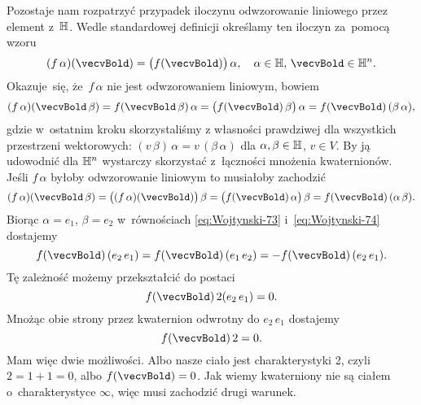\documentclass[a4paper,11pt]{article}
\numberwithin{equation}{section}
\begin{document}
Pozostaje nam rozpatrzyć przypadek iloczynu odwzorowanie liniowego przez
element z~$\mathbb{H}$. Wedle standardowej definicji określamy ten iloczyn
za~pomocą wzoru
\begin{equation}
  \label{eq:Wojtynski-72}
  ( f \, \alpha )( \vecvBold ) = \big( f( \vecvBold ) \big) \, \alpha, \quad
  \alpha \in \Hbb, \, \vecvBold \in \Hbb^{ n }.
\end{equation}
Okazuje~się, że~$f \, \alpha$ nie jest odwzorowaniem liniowym, bowiem
\begin{equation}
  \label{eq:Wojtynski-73}
  ( f \, \alpha )( \vecvBold \, \beta ) = f( \vecvBold \, \beta ) \, \alpha =
  \big( f( \vecvBold ) \, \beta \big) \, \alpha =
  f( \vecvBold ) \, ( \beta \, \alpha ),
\end{equation}
gdzie w~ostatnim kroku skorzystaliśmy z własności prawdziwej dla
wszystkich przestrzeni wektorowych:
$( v \, \beta ) \, \alpha = v \, ( \beta \, \alpha )$ dla $\alpha, \beta \in \mathbb{H}$, $v \in V$. By ją
udowodnić dla $\mathbb{H}^{ n }$ wystarczy skorzystać z~łączności mnożenia
kwaternionów. Jeśli $f \, \alpha$ byłoby odwzorowanie liniowym to musiałoby
zachodzić
\begin{equation}
  \label{eq:Wojtynski-74}
  ( f \, \alpha )( \vecvBold \, \beta ) =
  \big( ( f \, \alpha )( \vecvBold ) \big) \, \beta =
  \big( f( \vecvBold ) \, \alpha \big) \, \beta =
  f( \vecvBold ) \, ( \alpha \, \beta ).
\end{equation}
Biorąc $\alpha = e_{ 1 }$, $\beta = e_{ 2 }$ w~równościach \eqref{eq:Wojtynski-73}
i~\eqref{eq:Wojtynski-74} dostajemy
\begin{equation}
  \label{eq:Wojtynski-75}
  f( \vecvBold ) \, ( e_{ 2 } \, e_{ 1 } ) =
  f( \vecvBold ) \, ( e_{ 1 } \, e_{ 2 } ) =
  -f( \vecvBold ) \, ( e_{ 2 } \, e_{ 1 } ).
\end{equation}
Tę zależność możemy przekształcić do postaci
\begin{equation}
  \label{eq:Wojtynski-76}
  f( \vecvBold ) \, 2 ( e_{ 2 } \, e_{ 1 } ) = 0.
\end{equation}
Mnożąc obie strony przez kwaternion odwrotny do $e_{ 2 } \, e_{ 1 }$
dostajemy
\begin{equation}
  \label{eq:Wojtynski-77}
  f( \vecvBold ) \, 2 = 0.
\end{equation}
Mam więc dwie możliwości. Albo nasze ciało jest charakterystyki 2,
czyli~$2 = 1 + 1 = 0$, albo $f( \vecvBold ) = 0$. Jak wiemy kwaterniony nie
są ciałem o~charakterystyce $\infty$, więc musi zachodzić drugi warunek.
\end{document}
